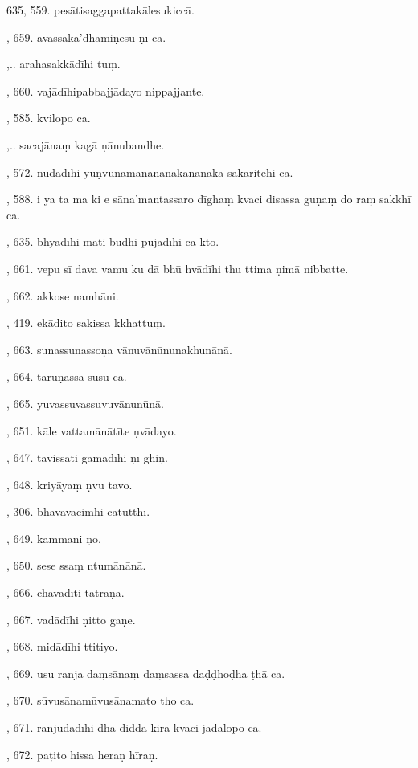 635, 559. pesātisaggapattakālesukiccā.\par {}, 659. avassakā’dhamiṇesu ṇī ca.\par {},.. arahasakkādīhi tuṃ.\par {}, 660. vajādīhipabbajjādayo nippajjante.\par {}, 585. kvilopo ca.\par {},.. sacajānaṃ kagā ṇānubandhe.\par {}, 572. nudādīhi yuṇvūnamanānanākānanakā sakāritehi ca.\par {}, 588. i ya ta ma ki e sāna’mantassaro dīghaṃ kvaci disassa guṇaṃ do raṃ sakkhī ca.\par {}, 635. bhyādīhi mati budhi pūjādīhi ca kto.\par {}, 661. vepu sī dava vamu ku dā bhū hvādīhi thu ttima ṇimā nibbatte.\par {}, 662. akkose namhāni.\par {}, 419. ekādito sakissa kkhattuṃ.\par {}, 663. sunassunassoṇa vānuvānūnunakhunānā.\par {}, 664. taruṇassa susu ca.\par {}, 665. yuvassuvassuvuvānunūnā.\par {}, 651. kāle vattamānātīte ṇvādayo.\par {}, 647. tavissati gamādīhi ṇī ghiṇ.\par {}, 648. kriyāyaṃ ṇvu tavo.\par {}, 306. bhāvavācimhi catutthī.\par {}, 649. kammani ṇo.\par {}, 650. sese ssaṃ ntumānānā.\par {}, 666. chavādīti tatraṇa.\par {}, 667. vadādīhi ṇitto gaṇe.\par {}, 668. midādīhi ttitiyo.\par {}, 669. usu ranja daṃsānaṃ daṃsassa daḍḍhoḍha ṭhā ca.\par {}, 670. sūvusānamūvusānamato tho ca.\par {}, 671. ranjudādīhi dha didda kirā kvaci jadalopo ca.\par {}, 672. paṭito hissa heraṇ hīraṇ.\par \noindent
